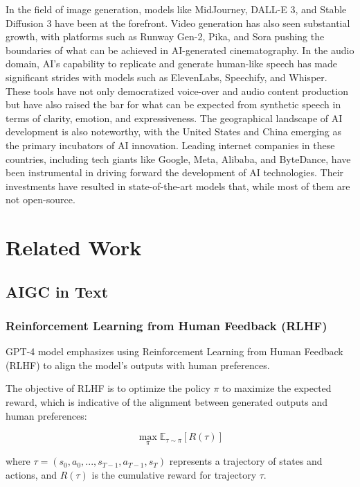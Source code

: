 \documentclass[11pt,a4paper,oneside]{report}
\begin{document}
In the field of image generation, models like MidJourney, DALL-E 3, and Stable Diffusion 3 have been at the forefront. 
Video generation has also seen substantial growth, with platforms such as Runway Gen-2, Pika, and Sora pushing the boundaries of what can be achieved in AI-generated cinematography. 
In the audio domain, AI's capability to replicate and generate human-like speech has made significant strides with models such as ElevenLabs, Speechify, and Whisper. 
These tools have not only democratized voice-over and audio content production but have also raised the bar for what can be expected from synthetic speech in terms of clarity, emotion, and expressiveness. 
The geographical landscape of AI development is also noteworthy, with the United States and China emerging as the primary incubators of AI innovation. 
Leading internet companies in these countries, including tech giants like Google, Meta, Alibaba, and ByteDance, have been instrumental in driving forward the development of AI technologies. 
Their investments have resulted in state-of-the-art models that, while most of them are not open-source.

\chapter{Related Work}

\section{AIGC in Text}

\subsection{Reinforcement Learning from Human Feedback (RLHF)}

GPT-4 model emphasizes using Reinforcement Learning from Human Feedback (RLHF) \cite{christiano2017deep} to align the model's outputs with human preferences. 

The objective of RLHF is to optimize the policy $\pi$ to maximize the expected reward, which is indicative of the alignment between generated outputs and human preferences:

\begin{equation}
\max_{\pi} \mathbb{E}_{\tau \sim \pi} [R(\tau)]
\end{equation}

where $\tau = (s_0, a_0, ..., s_{T-1}, a_{T-1}, s_T)$ represents a trajectory of states and actions, and $R(\tau)$ is the cumulative reward for trajectory $\tau$.
\end{document}
